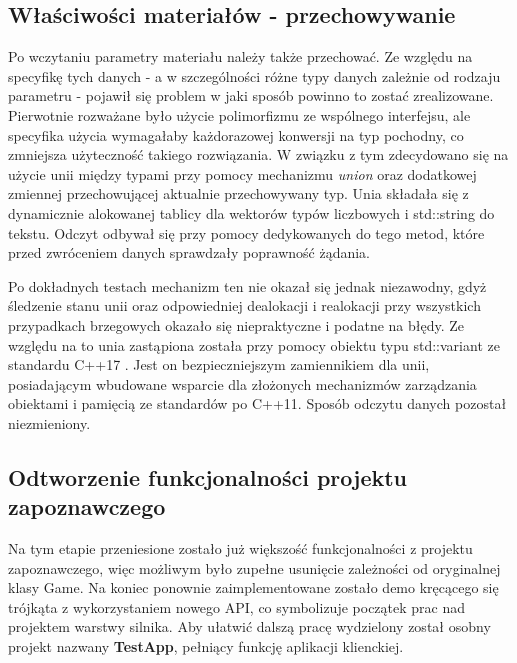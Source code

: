 \subsection{Właściwości materiałów - przechowywanie}
Po wczytaniu parametry materiału należy także przechować. Ze względu na specyfikę tych danych - a w szczególności różne typy danych zależnie od rodzaju parametru - pojawił się problem w jaki sposób powinno to zostać zrealizowane. Pierwotnie rozważane było użycie polimorfizmu ze wspólnego interfejsu, ale specyfika użycia wymagałaby każdorazowej konwersji na typ pochodny, co zmniejsza użyteczność takiego rozwiązania. W związku z tym zdecydowano się na użycie unii między typami przy pomocy mechanizmu \textit{union} oraz dodatkowej zmiennej przechowującej aktualnie przechowywany typ. Unia składała się z dynamicznie alokowanej tablicy dla wektorów typów liczbowych i std::string do tekstu. Odczyt odbywał się przy pomocy dedykowanych do tego metod, które przed zwróceniem danych sprawdzały poprawność żądania. 

Po dokładnych testach mechanizm ten nie okazał się jednak niezawodny, gdyż śledzenie stanu unii oraz odpowiedniej dealokacji i realokacji przy wszystkich przypadkach brzegowych okazało się niepraktyczne i podatne na błędy. Ze względu na to unia zastąpiona została przy pomocy obiektu typu std::variant ze standardu C++17 \cite{cpp17:variant:2025}. Jest on bezpieczniejszym zamiennikiem dla unii, posiadającym wbudowane wsparcie dla złożonych mechanizmów zarządzania obiektami i pamięcią ze standardów po C++11. Sposób odczytu danych pozostał niezmieniony.

\subsection{Odtworzenie funkcjonalności projektu zapoznawczego}
Na tym etapie przeniesione zostało już większość funkcjonalności z projektu zapoznawczego, więc możliwym było zupełne usunięcie zależności od oryginalnej klasy Game. Na koniec ponownie zaimplementowane zostało demo kręcącego się trójkąta z wykorzystaniem nowego API, co symbolizuje początek prac nad projektem warstwy silnika. Aby ułatwić dalszą pracę wydzielony został osobny projekt nazwany \textbf{TestApp}, pełniący funkcję aplikacji klienckiej.


